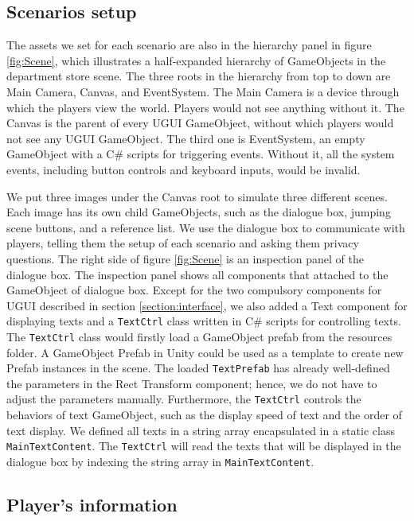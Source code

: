 \documentclass[msc,deptreport,ai]{infthesis}      %
\begin{document}
\subsection{Scenarios setup}

The assets we set for each scenario are also in the hierarchy panel in figure \ref{fig:Scene}, which illustrates a half-expanded hierarchy of GameObjects in the department store scene. The three roots in the hierarchy from top to down are Main Camera, Canvas, and EventSystem. The Main Camera is a device through which the players view the world. Players would not see anything without it. The Canvas is the parent of every UGUI GameObject, without which players would not see any UGUI GameObject. The third one is EventSystem, an empty GameObject with a C\# scripts for triggering events. Without it, all the system events, including button controls and keyboard inputs, would be invalid.

We put three images under the Canvas root to simulate three different scenes. Each image has its own child GameObjects, such as the dialogue box, jumping scene buttons, and a reference list. We use the dialogue box to communicate with players, telling them the setup of each scenario and asking them privacy questions. The right side of figure \ref{fig:Scene} is an inspection panel of the dialogue box. The inspection panel shows all components that attached to the GameObject of dialogue box. Except for the two compulsory components for UGUI described in section \ref{section:interface}, we also added a Text component for displaying texts and a \texttt{TextCtrl} class written in C\# scripts for controlling texts. The \texttt{TextCtrl} class would firstly load a GameObject prefab from the resources folder. A GameObject Prefab in Unity could be used as a template to create new Prefab instances in the scene. The loaded \texttt{TextPrefab} has already well-defined the parameters in the Rect Transform component; hence, we do not have to adjust the parameters manually. Furthermore, the \texttt{TextCtrl} controls the behaviors of text GameObject, such as the display speed of text and the order of text display. We defined all texts in a string array encapsulated in a static class \texttt{MainTextContent}. The \texttt{TextCtrl} will read the texts that will be displayed in the dialogue box by indexing the string array in \texttt{MainTextContent}.

\subsection{Player's information}
\label{section:player}
\end{document}
